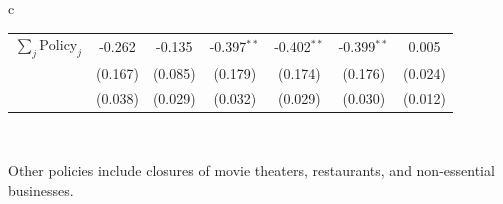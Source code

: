 \documentclass{beamer}
\def\bcolor{\color{forestgreen(web)}}
\def\pcolor{\color{blue}}
\renewcommand{\to}{{\rightarrow}}
\begin{document}
\begin{frame}
\begin{table}
\begin{minipage}{\linewidth}
\begin{tabular}{c}
\begin{tabular}{lccc|c|c|c}
$\sum_j \mathrm{Policy}_j$ & -0.262 & -0.135 & -0.397$^{**}$ & -0.402$^{**}$ & -0.399$^{**}$ & 0.005\\
 & (0.167) & (0.085) & (0.179) & (0.174) & (0.176) & (0.024)\\
 & (0.038) & (0.029) & (0.032) & (0.029) & (0.030) & (0.012)\\
\bottomrule
\end{tabular}
    \\
  \end{tabular}
  \end{minipage}
\end{table}
\begin{flushleft}
\footnotesize
Other policies include closures of movie theaters, restaurants, and non-essential businesses.
\end{flushleft}
\end{frame}
\end{document}
